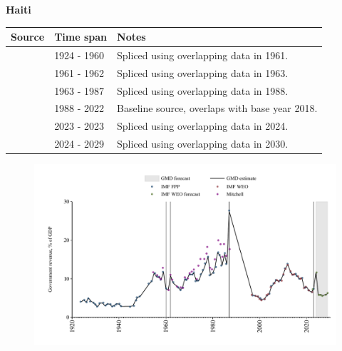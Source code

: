 \documentclass[12pt,a4paper,landscape]{article}
\begin{document}
\begin{adjustbox}{max totalsize={\paperwidth}{\paperheight},center}
\begin{minipage}[t][\textheight][t]{\textwidth}
\vspace*{0.5cm}
{}
\begin{center}
{\Large\bfseries Haiti}
\end{center}
\vspace{0.5cm}
\begin{table}[H]
\centering
\small
\begin{tabular}{|l|l|l|}
\hline
\textbf{Source} & \textbf{Time span} & \textbf{Notes} \\
\hline
\rowcolor{white}\cite{IMF_FPP}& 1924 - 1960 &Spliced using overlapping data in 1961.\\
\rowcolor{lightgray}\cite{Mitchell}& 1961 - 1962 &Spliced using overlapping data in 1963.\\
\rowcolor{white}\cite{IMF_FPP}& 1963 - 1987 &Spliced using overlapping data in 1988.\\
\rowcolor{lightgray}\cite{IMF_WEO}& 1988 - 2022 &Baseline source, overlaps with base year 2018.\\
\rowcolor{white}\cite{IMF_FPP}& 2023 - 2023 &Spliced using overlapping data in 2024.\\
\rowcolor{lightgray}\cite{IMF_WEO_forecast}& 2024 - 2029 &Spliced using overlapping data in 2030.\\
\hline
\end{tabular}
\end{table}
\begin{figure}[H]
\centering
\includegraphics[width=\textwidth,height=0.6\textheight,keepaspectratio]{graphs/HTI_govrev_GDP.pdf}
\end{figure}
\end{minipage}
\end{adjustbox}
\end{document}
